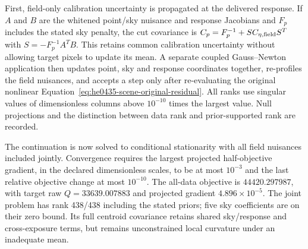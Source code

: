 First, field-only calibration uncertainty is propagated at the
delivered response. If $A$ and $B$ are the whitened point/sky nuisance
and response Jacobians and $F_p$ includes the stated sky penalty,
the cut covariance is
$C_p=F_p^{-1}+S C_{\eta,\rm field}S^T$ with
$S=-F_p^{-1}A^TB$. This retains common calibration uncertainty
without allowing target pixels to update its mean. A separate
coupled Gauss--Newton application then updates point, sky and response
coordinates together, re-profiles the field nuisances, and accepts
a step only after re-evaluating the original nonlinear
Equation~\eqref{eq:he0435-scene-original-residual}.
All ranks use singular values of dimensionless columns above
$10^{-10}$ times the largest value. Null projections and the
distinction between data rank and prior-supported rank are recorded.

The continuation is now solved to conditional stationarity with all field
nuisances included jointly. Convergence requires the largest projected
half-objective gradient, in the declared dimensionless scales, to be at
most $10^{-3}$ and the last relative objective change at most $10^{-10}$.
The all-data objective is $44420.297987$, with target raw
$Q=33639.007883$ and projected gradient $4.896\times10^{-5}$.
The joint problem has rank 438/438 including the stated priors; five sky
coefficients are on their zero bound. Its full centroid covariance
retains shared sky/response and cross-exposure terms, but remains
unconstrained local curvature under an inadequate mean.

